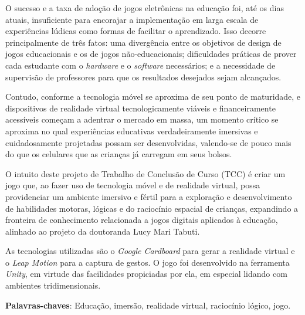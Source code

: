 \begin{resumo}
\begin{comment}
O resumo deve ser redigido, preferencialmente, na terceira pessoa do singular com verbo na voz ativa, em parágrafo único, e conter no máximo 500 palavras.
\end{comment}

O sucesso e a taxa de adoção de jogos eletrônicas na educação foi, 
até os dias atuais, insuficiente para encorajar a implementação 
em larga escala de experiências lúdicas como formas de facilitar 
o aprendizado. Isso decorre principalmente de três fatos: 
uma divergência entre os objetivos de design de jogos 
educacionais e os de jogos não-educacionais; dificuldades 
práticas de prover cada estudante com o \textit{hardware} e o \textit{software} 
necessários; e a necessidade de supervisão de professores 
para que os resultados desejados sejam alcançados.

Contudo, conforme a tecnologia móvel se aproxima de seu ponto 
de maturidade, e dispositivos de realidade virtual tecnologicamente 
viáveis e financeiramente acessíveis começam a adentrar o 
mercado em massa, um momento crítico se aproxima no qual 
experiências educativas verdadeiramente imersivas e cuidadosamente 
projetadas possam ser desenvolvidas, valendo-se de pouco mais 
do que os celulares que as crianças já carregam em seus bolsos.

O intuito deste projeto de Trabalho de Conclusão de Curso 
(TCC) é criar um jogo que, ao fazer uso de tecnologia móvel 
e de realidade virtual, possa providenciar um ambiente 
imersivo e fértil para a exploração e desenvolvimento de 
habilidades motoras, lógicas e do raciocínio espacial de 
crianças, expandindo a fronteira de conhecimento relacionada 
a jogos digitais aplicados à educação, alinhado ao projeto 
da doutoranda Lucy Mari Tabuti.

As tecnologias utilizadas são o \textit{Google Cardboard} para 
gerar a realidade virtual e o\textit{ Leap Motion} para a captura 
de gestos. O jogo foi desenvolvido na ferramenta \textit{Unity}, 
em virtude das facilidades propiciadas por ela, em 
especial lidando com ambientes tridimensionais.

 \vspace{\onelineskip}

 \noindent
 \textbf{Palavras-chaves}: Educação, imersão, realidade virtual, raciocínio lógico, jogo.
\end{resumo}
 

